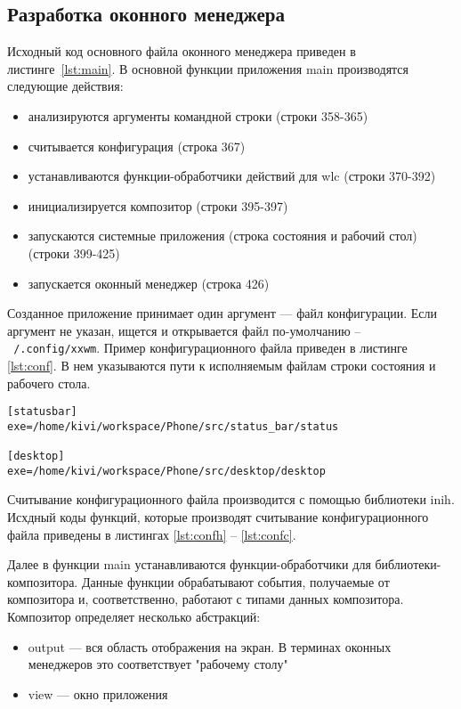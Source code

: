 \subsection{Разработка оконного менеджера}
Исходный код основного файла оконного менеджера приведен в листинге~\ref{lst:main}. В основной функции приложения main производятся следующие действия:
\begin{itemize}
\item анализируются аргументы командной строки (строки 358-365)
\item считывается конфигурация (строка 367)
\item устанавливаются функции-обработчики действий для wlc (строки 370-392)
\item инициализируется композитор (строки 395-397)
\item запускаются системные приложения (строка состояния и рабочий стол) (строки 399-425)
\item запускается оконный менеджер (строка 426)
\end{itemize}

Созданное приложение принимает один аргумент --- файл конфигурации. Если аргумент не указан, ищется и открывается файл по-умолчанию -- \texttt{~/.config/xxwm}. Пример конфигурационного файла приведен в листинге \ref{lst:conf}. В нем указываются пути к исполняемым файлам строки состояния и рабочего стола.

\begin{lstlisting}[label=lst:conf, caption={Формат конфигурационного файла ОМ}]
[statusbar]
exe=/home/kivi/workspace/Phone/src/status_bar/status

[desktop]
exe=/home/kivi/workspace/Phone/src/desktop/desktop
\end{lstlisting}

Считывание конфигурационного файла производится с помощью библиотеки inih. Исхдный коды функций, которые производят считывание конфигурационного файла приведены в листингах \ref{lst:confh} -- \ref{lst:confc}.

Далее в функции main устанавливаются функции-обработчики для библиотеки-композитора. Данные функции обрабатывают события, получаемые от композитора и, соответственно, работают с типами данных композитора.  Композитор определяет несколько абстракций:
\begin{itemize}
\item output --- вся область отображения на экран. В терминах оконных менеджеров это соответствует "рабочему столу"
\item view --- окно приложения
\end{itemize}

